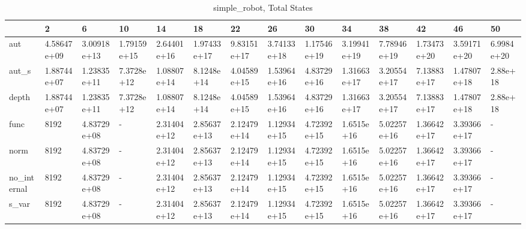 \begin{table}
\caption{simple_robot, Total States}
\label{simple_robot_total}
\begin{tabular}{llllllllllllll}
\toprule
 & 2 & 6 & 10 & 14 & 18 & 22 & 26 & 30 & 34 & 38 & 42 & 46 & 50 \\
\midrule
aut & 4.58647e+09 & 3.00918e+13 & 1.79159e+15 & 2.64401e+16 & 1.97433e+17 & 9.83151e+17 & 3.74133e+18 & 1.17546e+19 & 3.19941e+19 & 7.78946e+19 & 1.73473e+20 & 3.59171e+20 & 6.9984e+20 \\
aut_s & 1.88744e+07 & 1.23835e+11 & 7.3728e+12 & 1.08807e+14 & 8.1248e+14 & 4.04589e+15 & 1.53964e+16 & 4.83729e+16 & 1.31663e+17 & 3.20554e+17 & 7.13883e+17 & 1.47807e+18 & 2.88e+18 \\
depth & 1.88744e+07 & 1.23835e+11 & 7.3728e+12 & 1.08807e+14 & 8.1248e+14 & 4.04589e+15 & 1.53964e+16 & 4.83729e+16 & 1.31663e+17 & 3.20554e+17 & 7.13883e+17 & 1.47807e+18 & 2.88e+18 \\
func & 8192 & 4.83729e+08 & - & 2.31404e+12 & 2.85637e+13 & 2.12479e+14 & 1.12934e+15 & 4.72392e+15 & 1.6515e+16 & 5.02257e+16 & 1.36642e+17 & 3.39366e+17 & - \\
norm & 8192 & 4.83729e+08 & - & 2.31404e+12 & 2.85637e+13 & 2.12479e+14 & 1.12934e+15 & 4.72392e+15 & 1.6515e+16 & 5.02257e+16 & 1.36642e+17 & 3.39366e+17 & - \\
no_internal & 8192 & 4.83729e+08 & - & 2.31404e+12 & 2.85637e+13 & 2.12479e+14 & 1.12934e+15 & 4.72392e+15 & 1.6515e+16 & 5.02257e+16 & 1.36642e+17 & 3.39366e+17 & - \\
s_var & 8192 & 4.83729e+08 & - & 2.31404e+12 & 2.85637e+13 & 2.12479e+14 & 1.12934e+15 & 4.72392e+15 & 1.6515e+16 & 5.02257e+16 & 1.36642e+17 & 3.39366e+17 & - \\
\bottomrule
\end{tabular}
\end{table}
